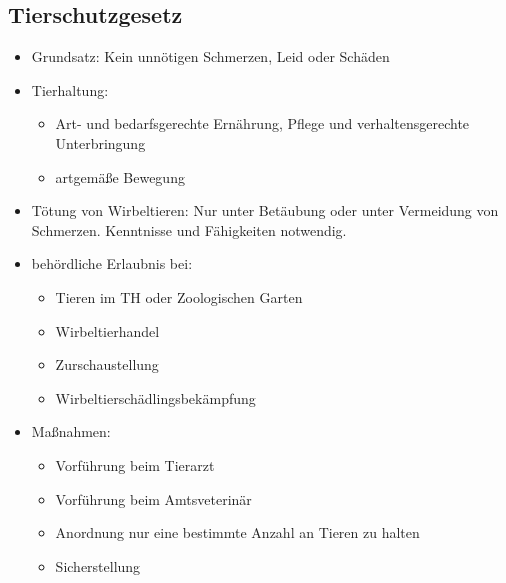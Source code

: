     \subsection{Tierschutzgesetz}
        \begin{itemize}
            \item Grundsatz: Kein unnötigen Schmerzen, Leid oder Schäden
            \item Tierhaltung:
            \begin{itemize}
                \item Art- und bedarfsgerechte Ernährung, Pflege und verhaltensgerechte Unterbringung
                \item artgemäße Bewegung
            \end{itemize}
            \item Tötung von Wirbeltieren: Nur unter Betäubung oder unter Vermeidung von Schmerzen. Kenntnisse und Fähigkeiten notwendig.
            \item behördliche Erlaubnis bei:
            \begin{itemize}
                \item Tieren im TH oder Zoologischen Garten
                \item Wirbeltierhandel
                \item Zurschaustellung
                \item Wirbeltierschädlingsbekämpfung
            \end{itemize}
            \item Maßnahmen:
            \begin{itemize}
                \item Vorführung beim Tierarzt
                \item Vorführung beim Amtsveterinär
                \item Anordnung nur eine bestimmte Anzahl an Tieren zu halten
                \item Sicherstellung
            \end{itemize}
        \end{itemize}

